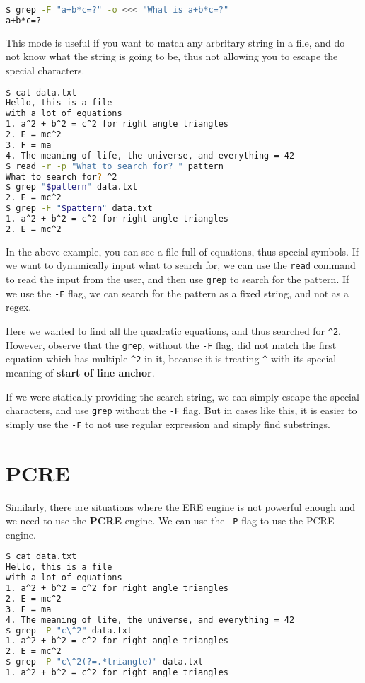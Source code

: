 \begin{lstlisting}[language=bash]
$ grep -F "a+b*c=?" -o <<< "What is a+b*c=?"
a+b*c=?
\end{lstlisting}

This mode is useful if you want to match any arbritary string in a file, and do not know what the string is going to be, thus not allowing you to escape the special characters.

\begin{lstlisting}[language=bash]
$ cat data.txt
Hello, this is a file
with a lot of equations
1. a^2 + b^2 = c^2 for right angle triangles
2. E = mc^2
3. F = ma
4. The meaning of life, the universe, and everything = 42
$ read -r -p "What to search for? " pattern
What to search for? ^2
$ grep "$pattern" data.txt
2. E = mc^2
$ grep -F "$pattern" data.txt
1. a^2 + b^2 = c^2 for right angle triangles
2. E = mc^2
\end{lstlisting}

In the above example, you can see a file full of equations, thus special symbols.
If we want to dynamically input what to search for, we can use the \lstinline|read| command to read the input from the user, and then use \lstinline|grep| to search for the pattern. If we use the \lstinline|-F| flag, we can search for the pattern as a fixed string, and not as a regex.

Here we wanted to find all the quadratic equations, and thus searched for \lstinline|^2|.
However, observe that the \lstinline|grep|, without the \lstinline|-F| flag, did not match the first equation which has multiple \lstinline|^2| in it, because it is treating \lstinline|^| with its special meaning of \textbf{start of line anchor}.

If we were statically providing the search string, we can simply escape the special characters, and use \lstinline|grep| without the \lstinline|-F| flag. But in cases like this, it is easier to simply use the \lstinline|-F| to not use regular expression and simply find substrings.

\section{PCRE}

Similarly, there are situations where the ERE engine is not powerful enough and we need to use the \textbf{PCRE} engine. We can use the \lstinline|-P| flag to use the PCRE engine.

\begin{lstlisting}[language=bash]
$ cat data.txt
Hello, this is a file
with a lot of equations
1. a^2 + b^2 = c^2 for right angle triangles
2. E = mc^2
3. F = ma
4. The meaning of life, the universe, and everything = 42
$ grep -P "c\^2" data.txt
1. a^2 + b^2 = c^2 for right angle triangles
2. E = mc^2
$ grep -P "c\^2(?=.*triangle)" data.txt
1. a^2 + b^2 = c^2 for right angle triangles
\end{lstlisting}

